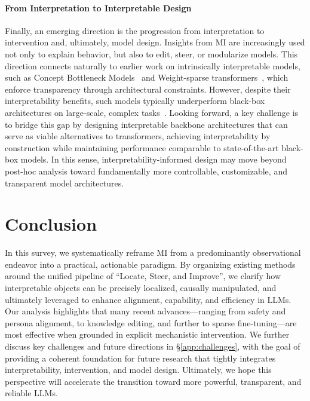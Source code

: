 \documentclass[11pt,letterpaper]{mystyle}
\begin{document}
\paragraph{From Interpretation to Interpretable Design} 
Finally, an emerging direction is the progression from interpretation to intervention and, ultimately, model design. Insights from MI are increasingly used not only to explain behavior, but also to edit, steer, or modularize models. This direction connects naturally to earlier work on intrinsically interpretable models, such as Concept Bottleneck Models~\citep{ismail2024concept,sunconcept2024,shang2024understanding,shang2024incremental,tan2024interpreting,hu2025editableconceptbottleneckmodels,zhao2025partially} and Weight-sparse transformers~\citep{gao2025weight}, which enforce transparency through architectural constraints. However, despite their interpretability benefits, such models typically underperform black-box architectures on large-scale, complex tasks~\citep{srivastava2024vlg}. Looking forward, a key challenge is to bridge this gap by designing interpretable backbone architectures that can serve as viable alternatives to transformers, achieving interpretability by construction while maintaining performance comparable to state-of-the-art black-box models. In this sense, interpretability-informed design may move beyond post-hoc analysis toward fundamentally more controllable, customizable, and transparent model architectures.

\section{Conclusion}
\label{sec:conclusion}
In this survey, we systematically reframe MI from a predominantly observational endeavor into a practical, actionable paradigm. By organizing existing methods around the unified pipeline of ``Locate, Steer, and Improve'', we clarify how interpretable objects can be precisely localized, causally manipulated, and ultimately leveraged to enhance alignment, capability, and efficiency in LLMs.
Our analysis highlights that many recent advances---ranging from safety and persona alignment, to knowledge editing, and further to sparse fine-tuning---are most effective when grounded in explicit mechanistic intervention. We further discuss key challenges and future directions in \S\ref{app:challenges}, with the goal of providing a coherent foundation for future research that tightly integrates interpretability, intervention, and model design. Ultimately, we hope this perspective will accelerate the transition toward more powerful, transparent, and reliable LLMs.
\end{document}
